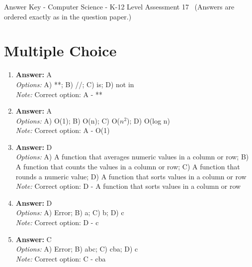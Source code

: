 \documentclass[12pt]{article}
\begin{document}
\begin{center}
Answer Key - Computer Science - K-12 Level Assessment 17 \
\small (Answers are ordered exactly as in the question paper.)
\end{center}

\section*{Multiple Choice}
\begin{enumerate}[label=\arabic*.]
\item \textbf{Answer:} A
\\ \textit{Options:} A) **; B) //; C) is; D) not in
\\ \textit{Note:} Correct option: A - **
\item \textbf{Answer:} A
\\ \textit{Options:} A) O(1); B) O(n); C) O($n^2$); D) O(log n)
\\ \textit{Note:} Correct option: A - O(1)
\item \textbf{Answer:} D
\\ \textit{Options:} A) A function that averages numeric values in a column or row; B) A function that counts the values in a column or row; C) A function that rounds a numeric value; D) A function that sorts values in a column or row
\\ \textit{Note:} Correct option: D - A function that sorts values in a column or row
\item \textbf{Answer:} D
\\ \textit{Options:} A) Error; B) a; C) b; D) c
\\ \textit{Note:} Correct option: D - c
\item \textbf{Answer:} C
\\ \textit{Options:} A) Error; B) abc; C) cba; D) c
\\ \textit{Note:} Correct option: C - cba
\end{enumerate}
\end{document}
